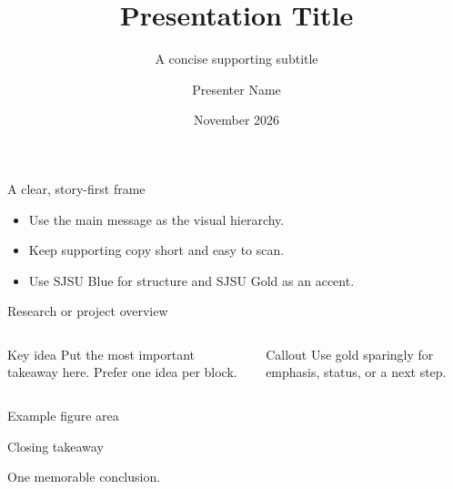 \documentclass[aspectratio=169,11pt]{beamer}
\title{Presentation Title}
\subtitle{A concise supporting subtitle}
\author{Presenter Name}
\institute{Department or unit name}
\date{November 2026}
\begin{document}
\begin{frame}[plain]
  \titlepage
\end{frame}

\begin{frame}{A clear, story-first frame}
  \begin{itemize}
    \item Use the main message as the visual hierarchy.
    \item Keep supporting copy short and easy to scan.
    \item Use SJSU Blue for structure and SJSU Gold as an accent.
  \end{itemize}
\end{frame}

\begin{frame}{Research or project overview}
  \begin{columns}[T,onlytextwidth]
      \begin{block}{Key idea}
        Put the most important takeaway here. Prefer one idea per block.
      \end{block}
      \begin{alertblock}{Callout}
        Use gold sparingly for emphasis, status, or a next step.
      \end{alertblock}
  \end{columns}
\end{frame}

\begin{frame}{Example figure area}
  \centering
\end{frame}

\begin{frame}{Closing takeaway}
  \centering
  \vfill
  {\color{SJSUBlue}One memorable conclusion.\par}
  \vspace{0.35cm}
  {\color{SJSUDarkGray}\sjsucontact\par}
  \vfill
\end{frame}
\end{document}
